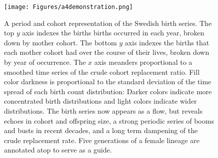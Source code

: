 \begin{figure}
\texttt{[image: Figures/a4demonstration.png]}
\caption{A period and cohort representation of the Swedish birth series. The top $y$ axis indexes the births births occurred in each year, broken down by mother cohort. The bottom $y$ axis indexes the births that each mother cohort had over the course of their lives, broken down by year of occurrence. The $x$ axis meanders proportional to a smoothed time series of the crude cohort replacement ratio. Fill color darkness is proportional to the standard deviation of the time spread of each birth count distribution: Darker colors indicate more concentrated birth distributions and light colors indicate wider distributions. The birth series now appears as a flow, but reveals echoes in cohort and offspring size, a strong periodic series of booms and busts in recent decades, and a long term dampening of the crude replacement rate. Five generations of a female lineage are annotated atop to serve as a guide.}
\label{fig:foldout}
\end{figure}